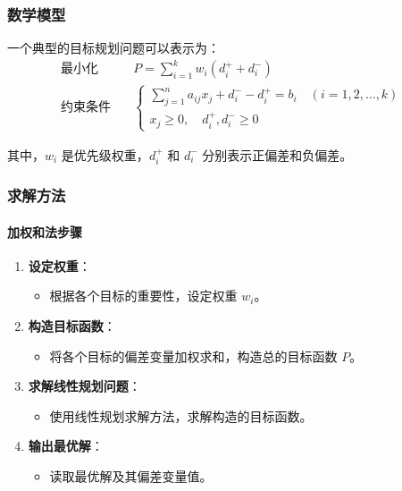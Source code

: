 \documentclass[UTF8]{ctexart}
\begin{document}
\subsubsection {数学模型}
一个典型的目标规划问题可以表示为：
\[
\begin{aligned}
\text{最小化} & \quad P = \sum_{i=1}^k w_i (d_i^+ + d_i^-) \\
\text{约束条件} & \quad 
\begin{cases}
\sum_{j=1}^n a_{ij} x_j + d_i^- - d_i^+ = b_i \quad (i=1,2,\ldots,k) \\
x_j \geq 0, \quad d_i^+, d_i^- \geq 0
\end{cases}
\end{aligned}
\]

其中，\( w_i \) 是优先级权重，\( d_i^+ \) 和 \( d_i^- \) 分别表示正偏差和负偏差。

\subsubsection {求解方法}
\paragraph{加权和法步骤}
\begin{enumerate}
    \item \textbf{设定权重}：
        \begin{itemize}
            \item 根据各个目标的重要性，设定权重 \( w_i \)。
        \end{itemize}
    \item \textbf{构造目标函数}：
        \begin{itemize}
            \item 将各个目标的偏差变量加权求和，构造总的目标函数 \( P \)。
        \end{itemize}
    \item \textbf{求解线性规划问题}：
        \begin{itemize}
            \item 使用线性规划求解方法，求解构造的目标函数。
        \end{itemize}
    \item \textbf{输出最优解}：
        \begin{itemize}
            \item 读取最优解及其偏差变量值。
        \end{itemize}
\end{enumerate}
\end{document}
